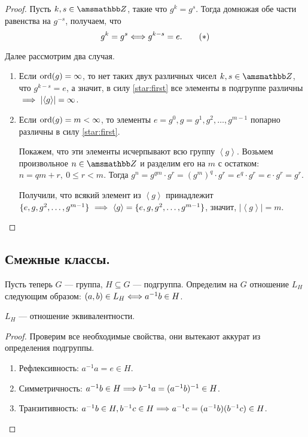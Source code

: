 \begin{proof}
  Пусть $k, s \in \ZZ$, такие что $g^k = g^s$.
  Тогда домножая обе части равенства на $g^{-s}$, получаем, что
  \[
    g^k = g^s \Longleftrightarrow g^{k - s} = e. \tag{$*$} \label{star:first}
  \]
  
  Далее рассмотрим два случая.
  \vspace{-0.2cm}
  \begin{enumerate}[label=\arabic*)]
    \item Если $\operatorname{ord}(g) = \infty$,
    то нет таких двух различных чисел $k, s \in \ZZ$, что $g^{k - s} = e$,
    а значит, в силу \eqref{star:first} все элементы в подгруппе различны 
    $\ \To \ \left|\left<g\right>\right| = \infty$.
    \item Если $\operatorname{ord}(g) = m < \infty$,
    то элементы $e = g^0, g = g^1, g^2, \ldots, g^{m-1}$ попарно различны
    в силу \eqref{star:first}.
    
    Покажем, что эти элементы исчерпывают всю группу $\left<g\right>$.
    Возьмем произвольное $n \in \ZZ$ и разделим его на $m$ с остатком:
    $n = qm + r, \ 0 \leqslant r < m$. 
    Тогда $g^n = g^{qm} \cdot g^r = (g^m)^q \cdot g^r = e^q \cdot g^r = e \cdot g^r = g^r$.
    
    Получили, что всякий элемент из $\left<g\right>$ принадлежит 
    $\{e, g, g^2, \dots, g^{m - 1}\} \ \To \
    \left<g\right> = \{e, g, g^2, \dots, g^{m - 1}\}$, значит,
    $\left|\left<g\right>\right| = m$.
  \end{enumerate}
\end{proof}

\newpage
\mysection
\subsection{Смежные классы.}

Пусть теперь $G$ --- группа, $H \subseteq G$ --- подгруппа.
Определим на $G$ отношение $L_H$ следующим образом:
$(a, b) \in L_H \Longleftrightarrow a^{-1}b \in H$.

\begin{proposal}\label{pr:first}
  $L_H$ --- отношение эквивалентности.
\end{proposal}

\begin{proof}
  Проверим все необходимые свойства, они вытекают аккурат
  из определения подгруппы.
  \vspace{-0.2cm}
  \begin{enumerate}
    \item Рефлексивность: $a^{-1}a = e \in H$.
    \item Симметричность: $a^{-1}b \in H \Longrightarrow b^{-1}a = (a^{-1}b)^{-1} \in H$.
    \item Транзитивность:
    $a^{-1}b \in H, b^{-1}c \in H \Longrightarrow a^{-1}c = (a^{-1}b)(b^{-1}c) \in H$.
  \end{enumerate}
  \vspace{-0.2cm}
\end{proof}

